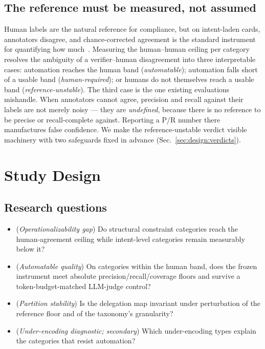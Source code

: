 \documentclass[conference]{IEEEtran}
\begin{document}
\subsection{The reference must be measured, not assumed}
Human labels are the natural reference for compliance, but on intent-laden
cards, annotators disagree, and chance-corrected agreement is the standard
instrument for quantifying how much~\cite{artstein2008inter,mchugh2012kappa}.
Measuring the human--human ceiling per category resolves the ambiguity of a
verifier--human disagreement into three interpretable cases: automation reaches
the human band (\emph{automatable}); automation falls short of a usable band
(\emph{human-required}); or humans do not themselves reach a usable band
(\emph{reference-unstable}). The third case is the one existing evaluations
mishandle. When annotators cannot agree, precision and recall against their
labels are not merely noisy --- they are \emph{undefined}, because there is no
reference to be precise or recall-complete against. Reporting a P/R number
there manufactures false confidence. We make the reference-unstable verdict
visible machinery with two safeguards fixed in advance
(Sec.~\ref{sec:design:verdicts}).

\section{Study Design}\label{sec:design}

\subsection{Research questions}\label{sec:design:rqs}
\begin{itemize}[leftmargin=1.6em]
  \item[\textbf{RQ1}] (\emph{Operationalizability gap}) Do structural constraint
  categories reach the human-agreement ceiling while intent-level categories
  remain measurably below it?
  \item[\textbf{RQ2}] (\emph{Automatable quality}) On categories within the
  human band, does the frozen instrument meet absolute precision/recall/coverage
  floors and survive a token-budget-matched LLM-judge control?
  \item[\textbf{RQ3}] (\emph{Partition stability}) Is the delegation map
  invariant under perturbation of the reference floor and of the taxonomy's
  granularity?
  \item[\textbf{RQ4}] (\emph{Under-encoding diagnostic; secondary}) Which
  under-encoding types explain the categories that resist automation?
\end{itemize}
\end{document}
